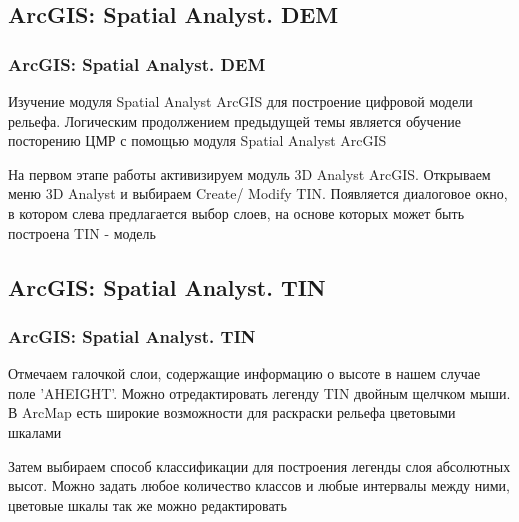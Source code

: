 \documentclass[pdflatex,compress,8pt,
	xcolor={dvipsnames,dvipsnames,svgnames,x11names,table},
	hyperref={	 
	pdfauthor={Lemenkova Polina}, 
	pdfsubject={Preentation}, 
	pdfcreator={Lemenkova Polina}, 
	pdfproducer={Lemenkova Polina}, 
	colorlinks=true,
	linkcolor=Red3, 
	citecolor=NavyBlue, 
	urlcolor = NavyBlue, 
	breaklinks = true}]{beamer}
\begin{document}
\subsection{ArcGIS: Spatial Analyst. DEM}
\begin{frame}\frametitle{ArcGIS: Spatial Analyst. DEM}

\begin{alertblock}{}
Изучение модуля Spatial Analyst ArcGIS для построение цифровой модели рельефа. Логическим продолжением предыдущей темы является обучение посторению ЦМР с помощью модуля Spatial Analyst ArcGIS
\end{alertblock}

\begin{block}{}
На первом этапе работы активизируем модуль 3D Analyst ArcGIS. Открываем меню 3D Analyst и выбираем Create/ Modify TIN. Появляется диалоговое окно, в котором слева предлагается выбор слоев, на основе которых может быть построена TIN - модель 
\end{block}

\begin{figure}[H]
	\centering
			\hspace{1mm}
\end{figure}

\end{frame}

\subsection{ArcGIS: Spatial Analyst. TIN}
\begin{frame}\frametitle{ArcGIS: Spatial Analyst. TIN}

\begin{block}{}
Отмечаем галочкой слои, содержащие информацию о высоте в нашем случае поле 'AHEIGHT'. Можно отредактировать легенду TIN двойным щелчком мыши. В ArcMap есть широкие возможности для раскраски рельефа цветовыми шкалами
\end{block}

\begin{alertblock}{}
Затем выбираем способ классификации для построения легенды слоя абсолютных высот. Можно задать любое количество классов и любые интервалы между ними, цветовые шкалы так же можно редактировать 
\end{alertblock}

\begin{figure}[H]
	\centering
			\hspace{1mm}
			\hspace{1mm}
\end{figure}

\end{frame}
\end{document}
